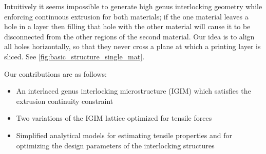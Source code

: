 Intuitively it seems impossible to generate high genus interlocking geometry while enforcing continuous extrusion for both materials;
if the one material leaves a hole in a layer then filling that hole with the other material will cause it to be disconnected from the other regions of the second material.
Our idea is to align all holes horizontally, so that they never cross a plane at which a printing layer is sliced.
See \cref{fig:basic_structure_single_mat}.


Our contributions are as follows:
\begin{itemize}
	\item An interlaced genus interlocking microstructure (IGIM) which satisfies the extrusion continuity constraint
	\item Two variations of the IGIM lattice optimized for tensile forces
	\item Simplified analytical models for estimating tensile properties and for optimizing the design parameters of the interlocking structures
\end{itemize}










